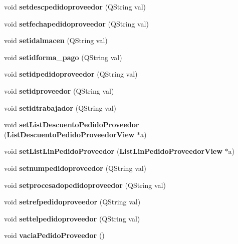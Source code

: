 \begin{CompactItemize}
\item 
void {\bf setdescpedidoproveedor} (QString val)\label{classPedidoProveedor_a30}

\item 
void {\bf setfechapedidoproveedor} (QString val)\label{classPedidoProveedor_a31}

\item 
void {\bf setidalmacen} (QString val)\label{classPedidoProveedor_a32}

\item 
void {\bf setidforma\_\-pago} (QString val)\label{classPedidoProveedor_a33}

\item 
void {\bf setidpedidoproveedor} (QString val)\label{classPedidoProveedor_a34}

\item 
void {\bf setidproveedor} (QString val)\label{classPedidoProveedor_a35}

\item 
void {\bf setidtrabajador} (QString val)\label{classPedidoProveedor_a36}

\item 
void {\bf set\-List\-Descuento\-Pedido\-Proveedor} ({\bf List\-Descuento\-Pedido\-Proveedor\-View} $\ast$a)\label{classPedidoProveedor_a37}

\item 
void {\bf set\-List\-Lin\-Pedido\-Proveedor} ({\bf List\-Lin\-Pedido\-Proveedor\-View} $\ast$a)\label{classPedidoProveedor_a38}

\item 
void {\bf setnumpedidoproveedor} (QString val)\label{classPedidoProveedor_a39}

\item 
void {\bf setprocesadopedidoproveedor} (QString val)\label{classPedidoProveedor_a40}

\item 
void {\bf setrefpedidoproveedor} (QString val)\label{classPedidoProveedor_a41}

\item 
void {\bf settelpedidoproveedor} (QString val)\label{classPedidoProveedor_a42}

\item 
void {\bf vacia\-Pedido\-Proveedor} ()\label{classPedidoProveedor_a43}

\end{CompactItemize}
